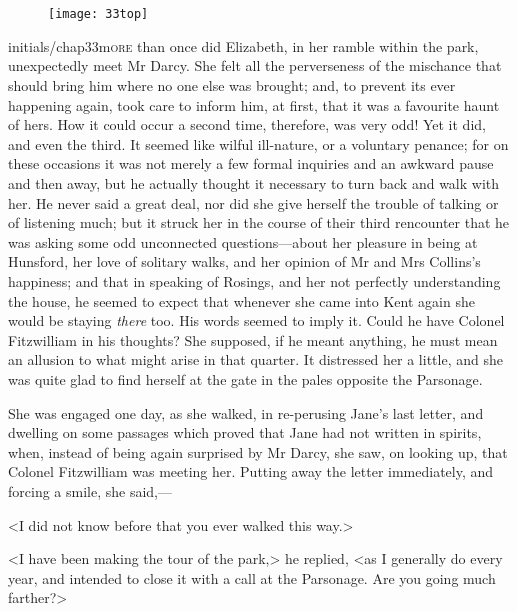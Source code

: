 \chapter[Chapter \thechapter]{}
	
	\begin{figure}[t!]
\centering
\texttt{[image: 33top]}
\end{figure}


\lettrine[lines=6,image=true]{initials/chap33m}{ore}  than once did Elizabeth, in her ramble within the park, unexpectedly meet Mr Darcy. She felt all the perverseness of the mischance that should bring him where no one else was brought; and, to prevent its ever happening again, took care to inform him, at first, that it was a favourite haunt of hers. How it could occur a second time, therefore, was very odd! Yet it did, and even the third. It seemed like wilful ill-nature, or a voluntary penance; for on these occasions it was not merely a few formal inquiries and an awkward pause and then away, but he actually thought it necessary to turn back and walk with her. He never said a great deal, nor did she give herself the trouble of talking or of listening much; but it struck her in the course of their third rencounter that he was asking some odd unconnected questions—about her pleasure in being at Hunsford, her love of solitary walks, and her opinion of Mr and Mrs Collins's happiness; and that in speaking of Rosings, and her not perfectly understanding the house, he seemed to expect that whenever she came into Kent again she would be staying \textit{there} too. His words seemed to imply it. Could he have Colonel Fitzwilliam in his thoughts? She supposed, if he meant anything, he must mean an allusion to what might arise in that quarter. It distressed her a little, and she was quite glad to find herself at the gate in the pales opposite the Parsonage.

She was engaged one day, as she walked, in re-perusing Jane's last letter, and dwelling on some passages which proved that Jane had not written in spirits, when, instead of being again surprised by Mr Darcy, she saw, on looking up, that Colonel Fitzwilliam was meeting her. Putting away the letter immediately, and forcing a smile, she said,—

<I did not know before that you ever walked this way.>

<I have been making the tour of the park,> he replied, <as I generally do every year, and intended to close it with a call at the Parsonage. Are you going much farther?>

